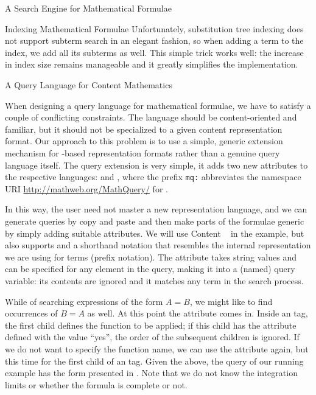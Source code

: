 \begin{omgroup}[id=mathwebsearch,creators={isucan,miko}]{A Search Engine for Mathematical Formulae}
\begin{omgroup}{Indexing Mathematical Formulae}
Unfortunately, substitution tree indexing does not support subterm search in an elegant
fashion, so when adding a term to the index, we add all its subterms as well. This simple
trick works well: the increase in index size remains manageable and it greatly simplifies
the implementation.
\end{omgroup}

\begin{omgroup}[id=mws.query]{A Query Language for Content Mathematics}

When designing a query language for mathematical formulae, we have to satisfy a couple of
conflicting constraints. The language should be content-oriented and familiar, but it
should not be specialized to a given content representation format.  Our approach to this
problem is to use a simple, generic extension mechanism for {\xml}-based representation
formats rather than a genuine query language itself.  The query extension is very simple,
it adds two new attributes to the respective languages:
{} and {}, where
the prefix {\tt{mq:}} abbreviates the namespace URI \url{http://mathweb.org/MathQuery/}
for {\mmlsearch}.

In this way, the user need not master a new representation language, and we can generate
queries by copy and paste and then make parts of the formulae generic by simply adding
suitable attributes. We will use Content {\mathml}~\cite{CarIon:MathML03} in the example,
but {\mmlsearch} also supports {\openmath} and a shorthand notation that resembles the
internal representation we are using for terms (prefix notation).  The
{} attribute takes string values and can be specified
for any element in the query, making it into a (named) query variable: its contents are
ignored and it matches any term in the search process.  

While of searching expressions of the form $A = B$, we might like to find occurrences of
$B = A$ as well. At this point the {} attribute comes
in.  Inside an {} tag, the first child defines the function to be applied;
if this child has the attribute {} defined with the
value ``yes'', the order of the subsequent children is ignored.  If we do not want to
specify the function name, we can use the {} attribute
again, but this time for the first child of an {} tag.  Given the above,
the query of our running example has the form presented in
{}. Note that we do not know the integration limits or whether
the formula is complete or not.


\end{omgroup}
\end{omgroup}
